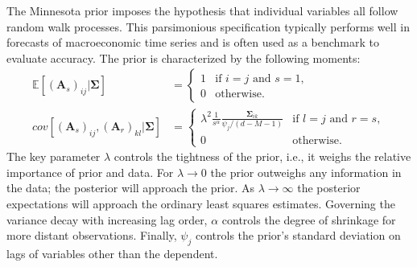 \documentclass[article,nojss]{jss} %
\begin{document}
The Minnesota prior \citep{litterman1980} imposes the hypothesis that individual variables all follow random walk processes. This parsimonious specification typically performs well in forecasts of macroeconomic time series \citep{kilian2017} and is often used as a benchmark to evaluate accuracy. The prior is characterized by the following moments:
\begin{align}
    \mathbb{E}[(\boldsymbol{A}_s)_{ij}|\boldsymbol{\Sigma}] &=
    \begin{cases}
        1 &\text{if } i=j \text{ and } s=1, \\
        0 &\text{otherwise}.
    \end{cases} \nonumber \\
    cov \left[(\boldsymbol{A}_s)_{ij}, (\boldsymbol{A}_r)_{kl} | \boldsymbol{\Sigma} \right] &=
    \begin{cases}
        \lambda^2 \frac{1}{s^\alpha} \frac{\boldsymbol{\Sigma}_{ik}}{\psi_j / (d-M-1)} &\text{if } l=j \text{ and } r=s, \\
        0 &\text{otherwise}. \nonumber
    \end{cases}
\end{align}
The key parameter $\lambda$ controls the tightness of the prior, i.e., it weighs the relative importance of prior and data. For $\lambda \to 0$ the prior outweighs any information in the data; the posterior will approach the prior. As $\lambda \to \infty$ the posterior expectations will approach the ordinary least squares estimates.
Governing the variance decay with increasing lag order, $\alpha$ controls the degree of shrinkage for more distant observations. Finally, $\psi_j$ controls the prior's standard deviation on lags of variables other than the dependent.
\end{document}
